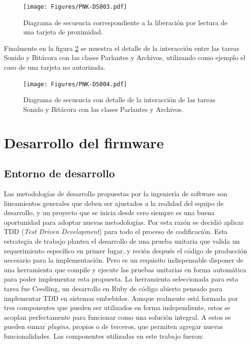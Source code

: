 \begin{figure}[ht]
	\centering
	\texttt{[image: Figures/PNK-DS003.pdf]}
	\caption[Liberación por lectura de una tarjeta de proximidad.]{Diagrama de secuencia correspondiente a la liberación por lectura de una tarjeta de proximidad.}
	\label{fig:LiberacionTarjeta}
\end{figure}

\FloatBarrier

Finalmente en la figura \ref{fig:SonidoBitacora} se muestra el detalle de la interacción entre las tareas Sonido y Bitácora con las clases Parlantes y Archivos, utilizando como ejemplo el caso de una tarjeta no autorizada.

\begin{figure}[ht]
	\centering
	\texttt{[image: Figures/PNK-DS004.pdf]}
	\caption[Detalle de interacción clases Sonido y Bitacora.]{Diagrama de secuencia con detalle de la interacción de las tareas Sonido y Bitácora con las clases Parlantes y Archivos.}
	\label{fig:SonidoBitacora}
\end{figure}

\FloatBarrier

\section{Desarrollo del firmware}
\label{sec:desarrollo}

\subsection{Entorno de desarrollo}

Las metodologías de desarrollo propuestas por la ingeniería de software son lineamientos generales que deben ser ajustados a la realidad del equipo de desarrollo, y un proyecto que se inicia desde cero siempre es una buena oportunidad para adoptar nuevas metodologías. Por esta razón se decidió aplicar TDD (\emph{Test Driven Development})\cite{grenning_test-driven_2012} para todo el proceso de codificación. Esta estrategia de trabajo plantea el desarrollo de una prueba unitaria que valida un requerimiento específico en primer lugar, y recién después el código de producción necesario para la implementación. Pero es un requisito indispensable disponer de una herramienta que compile y ejecute las pruebas unitarias en forma automática para poder implementar esta propuesta. La herramienta seleccionada para esta tarea fue Ceedling\cite{noauthor_ceedling_nodate}, un desarrollo en Ruby de código abierto pensado para implementar TDD en sistemas embebidos. Aunque realmente está formada por tres componentes que pueden ser utilizados en forma independiente, estos se acoplan perfectamente para funcionar como una solución integral. A estos se pueden sumar \emph{plugins}, propios o de terceros, que permiten agregar nuevas funcionalidades. Las componentes utilizadas en este trabajo fueron:

